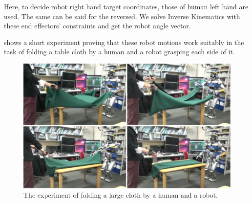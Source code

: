 Here, to decide robot right hand target coordinates, those of human left hand are used. The same can be said for the reversed. We solve Inverse Kinematics with these end effectors' constraints and get the robot angle vector.%

 shows a short experiment proving that these robot motions work suitably in the task of folding a table cloth by a human and a robot grasping each side of it. %

\begin{figure}[htbp]
 \begin{center}
  \includegraphics[width=1.00\columnwidth]{figs/fold_cloth_short}
  \caption{The experiment of folding a large cloth by a human and a robot.}
  \label{figure:folding_cloth}
 \end{center}
 \vspace{-5mm}
\end{figure}

